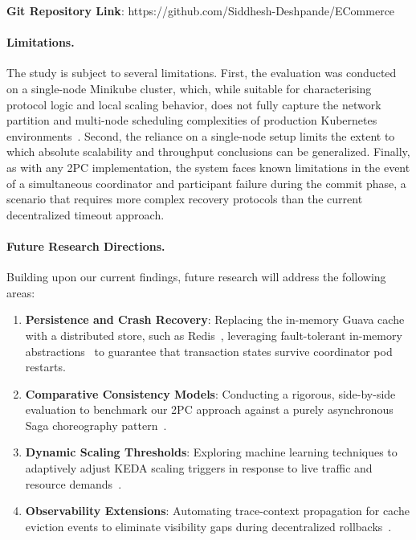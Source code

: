 \textbf{Git Repository Link}: https://github.com/Siddhesh-Deshpande/ECommerce
\paragraph{Limitations.}
The study is subject to several limitations. First, the evaluation was conducted on a single-node Minikube cluster, which, while suitable for characterising protocol logic and local scaling behavior, does not fully capture the network partition and multi-node scheduling complexities of production Kubernetes environments~\cite{verma2015large}. Second, the reliance on a single-node setup limits the extent to which absolute scalability and throughput conclusions can be generalized. Finally, as with any 2PC implementation, the system faces known limitations in the event of a simultaneous coordinator and participant failure during the commit phase, a scenario that requires more complex recovery protocols than the current decentralized timeout approach.

\paragraph{Future Research Directions.}
Building upon our current findings, future research will address the following areas:
\begin{enumerate}
  \item \textbf{Persistence and Crash Recovery}: Replacing the in-memory Guava cache with a distributed store, such as Redis~\cite{carlson2013redis}, leveraging fault-tolerant in-memory abstractions~\cite{zaharia2012resilient} to guarantee that transaction states survive coordinator pod restarts.
  \item \textbf{Comparative Consistency Models}: Conducting a rigorous, side-by-side evaluation to benchmark our 2PC approach against a purely asynchronous Saga choreography pattern~\cite{vogel2009eventual}.
  \item \textbf{Dynamic Scaling Thresholds}: Exploring machine learning techniques to adaptively adjust KEDA scaling triggers in response to live traffic and resource demands~\cite{stoica2018ray}.
  \item \textbf{Observability Extensions}: Automating trace-context propagation for cache eviction events to eliminate visibility gaps during decentralized rollbacks~\cite{dapper2010}.
\end{enumerate}

\backmatter









